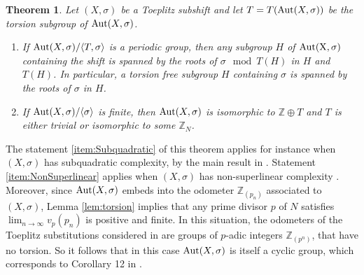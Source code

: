 \documentclass{daj}
\theoremstyle{plain}
\newtheorem{theorem}{Theorem}[section]
\theoremstyle{definition}
\begin{document}
\begin{theorem} \label{Thm:RootsToeplitz}
	Let $(X,\sigma)$ be a Toeplitz subshift and let $T=T({\rm Aut}(X,\sigma))$ be the torsion subgroup of ${\rm Aut}(X,\sigma)$.
	\begin{enumerate}
		\item \label{item:Subquadratic} If ${\rm Aut}(X,\sigma)/\langle T, \sigma  \rangle $ is a periodic group, then any subgroup $H$ of ${\rm Aut (X,\sigma)}$ containing the shift is spanned by the roots of $\sigma \mod T(H)$ in $H$ and $T(H)$. In particular, a torsion free subgroup  $H$ containing $\sigma$ is spanned by the roots of $\sigma$ in $H$.
		\item \label{item:NonSuperlinear} If ${\rm Aut}(X,\sigma)/\langle  \sigma  \rangle $ is finite, then ${\rm Aut}(X,\sigma)$ is isomorphic to $\mathbb{Z} \oplus T$   and $T$ is either trivial or isomorphic to some  $\mathbb{Z}_{N}$.
	\end{enumerate}
\end{theorem}
The statement \eqref{item:Subquadratic} of this theorem applies for instance when $(X,\sigma)$ has subquadratic complexity, by the main result in \cite{CyrKra}.  Statement \eqref{item:NonSuperlinear} applies when $(X,\sigma)$ has non-superlinear complexity \cite{DonosoDurandMaassPetite}. 
Moreover, since ${\rm Aut}(X, \sigma)$ embeds into the odometer $\mathbb{Z}_{(p_{n})}$ associated to $(X, \sigma)$, Lemma \ref{lem:torsion} implies that  any  prime divisor $p$ of $N$    satisfies  $\lim_{n\to\infty} v_{p}(p_{n})$ is positive and finite. 
In this situation, the odometers of the Toeplitz substitutions considered in \cite{CovenQuasYassawi} are groups of $p$-adic integers $\mathbb{Z}_{(p^n)}$, that have no torsion. So it follows that in this case ${\rm Aut }(X,\sigma)$ is itself a cyclic group, which corresponds to Corollary 12 in \cite{CovenQuasYassawi}.
\end{document}
